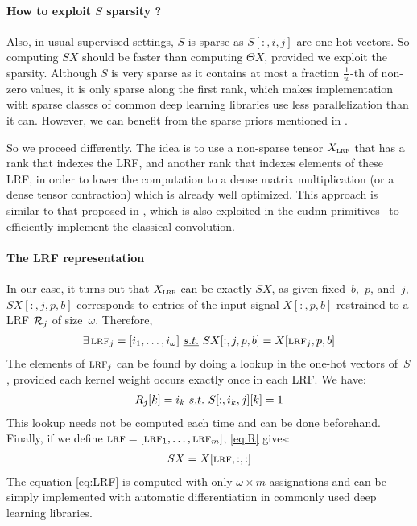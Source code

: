 \paragraph{How to exploit $S$ sparsity ?}
Also, in usual supervised settings, $S$ is sparse as $S[:,i,j]$ are one-hot vectors. So computing $SX$ should be faster than computing $\Theta X$, provided we exploit the sparsity. Although $S$ is very sparse as it contains at most a fraction $\frac{1}{w}$-th of non-zero values, it is only sparse along the first rank, which makes implementation with sparse classes of common deep learning libraries use less parallelization than it can. However, we can benefit from the sparse priors mentioned in .%

So we proceed differently. The idea is to use a non-sparse tensor $X_{\operatorname{\textsc{lrf}}}$ that has a rank that indexes the LRF, and another rank that indexes elements of these LRF, in order to lower the computation to a dense matrix multiplication (or a dense tensor contraction) which is already well optimized. This approach is similar to that proposed in \cite{chellapilla2006high}, which is also exploited in the cudnn primitives~\citep{chetlur2014cudnn} to efficiently implement the classical convolution.

\paragraph{The LRF representation}
In our case, it turns out that $X_{\operatorname{\textsc{lrf}}}$ can be exactly $SX$, as given fixed~$b$,~$p$, and~$j$, $SX[:,j,p,b]$ corresponds to entries of the input signal $X[:,p,b]$ restrained to a LRF $\mathcal{R}_j$ of size~$\omega$. Therefore,
\begin{gather}
\exists \operatorname{\textsc{lrf}}_j = [i_1, \ldots, i_\omega]~\emph{s.t.}~ SX[:,j,p,b] = X[\operatorname{\textsc{lrf}}_j, p, b]
\label{eq:R}
\end{gather}
The elements of $\operatorname{\textsc{lrf}}_j$ can be found by doing a lookup in the one-hot vectors of~$S$, provided each kernel weight occurs exactly once in each LRF. We have:
\begin{gather}
R_j[k] = i_k~\emph{s.t.}~ S[:,i_k,j][k] = 1
\end{gather}
This lookup needs not be computed each time and can be done beforehand. Finally, if we define $\operatorname{\textsc{lrf}} = [\operatorname{\textsc{lrf}}_1, \ldots, \operatorname{\textsc{lrf}}_m]$, \eqref{eq:R} gives:
\begin{gather}
SX = X[\operatorname{\textsc{lrf}}, :, :]
\label{eq:LRF}
\end{gather}
The equation \eqref{eq:LRF} is computed with only $\omega \times m$ assignations and can be simply implemented with automatic differentiation in commonly used deep learning libraries.

